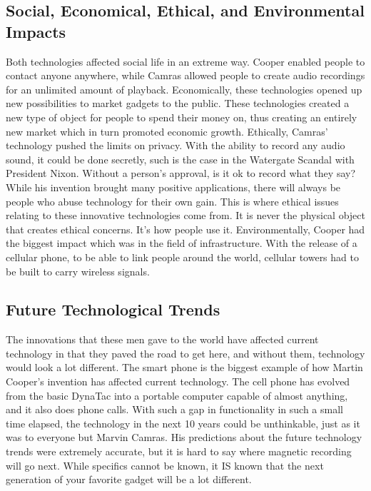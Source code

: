 \documentclass[12pt,letter]{article}
\begin{document}
\subsection{Social, Economical, Ethical, and Environmental Impacts}
Both technologies affected social life in an extreme way. Cooper enabled people to contact anyone anywhere, while Camras allowed people to create audio recordings for an unlimited amount of playback. Economically, these technologies opened up new possibilities to market gadgets to the public. These technologies created a new type of object for people to spend their money on, thus creating an entirely new market which in turn promoted economic growth. Ethically, Camras' technology pushed the limits on privacy. With the ability to record any audio sound, it could be done secretly, such is the case in the Watergate Scandal with President Nixon. Without a person's approval, is it ok to record what they say? While his invention brought many positive applications, there will always be people who abuse technology for their own gain. This is where ethical issues relating to these innovative technologies come from. It is never the physical object that creates ethical concerns. It's how people use it. Environmentally, Cooper had the biggest impact which was in the field of infrastructure. With the release of a cellular phone, to be able to link people around the world, cellular towers had to be built to carry wireless signals.
\subsection{Future Technological Trends}
The innovations that these men gave to the world have affected current technology in that they paved the road to get here, and without them, technology would look a lot different.  The smart phone is the biggest example of how Martin Cooper's invention has affected current technology. The cell phone has evolved from the basic DynaTac into a portable computer capable of almost anything, and it also does phone calls. With such a gap in functionality in such a small time elapsed, the technology in the next 10 years could be unthinkable, just as it was to everyone but Marvin Camras. His predictions about the future technology trends were extremely accurate, but it is hard to say where magnetic recording will go next. While specifics cannot be known, it IS known that the next generation of your favorite gadget will be a lot different.
\end{document}
